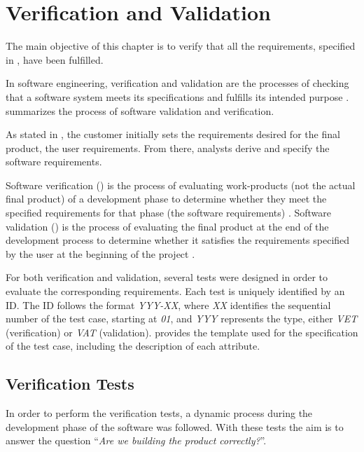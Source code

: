 \chapter{Verification and Validation}\label{chap:validation}
The main objective of this chapter is to verify that all the requirements, specified in , have been fulfilled.

In \gls{software engineering}, verification and validation are the processes of checking that a software system meets its specifications and fulfills its intended purpose \parencite{IEEE1012-2012}.  summarizes the process of software validation and verification.


As stated in , the customer initially sets the requirements desired for the final product, the user requirements. From there, analysts derive and specify the software requirements.

Software verification () is the process of evaluating work-products (not the actual final product) of a development phase to determine whether they meet the specified requirements for that phase (the software requirements) \parencite{IEEE1012-2012}. Software validation () is the process of evaluating the final product at the end of the development process to determine whether it satisfies the requirements specified by the user at the beginning of the project \parencite{IEEE1012-2012}.

For both verification and validation, several tests were designed in order to evaluate the corresponding requirements. Each test is uniquely identified by an ID. The ID follows the format \textit{YYY-XX}, where \textit{XX} identifies the sequential number of the test case, starting at \textit{01}, and \textit{YYY} represents the type, either \textit{VET} (verification) or \textit{VAT} (validation).  provides the template used for the specification of the test case, including the description of each attribute.





\section{Verification Tests}\label{sec:verification}
In order to perform the verification tests, a dynamic process during the development phase of the software was followed. With these tests the aim is to answer the question ``\textit{Are we building the product correctly?}''.


